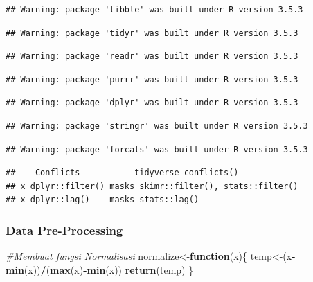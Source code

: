 \documentclass[]{article}
\newenvironment{Shaded}{\begin{snugshade}}{\end{snugshade}}
\newcommand{\CommentTok}[1]{\textcolor[rgb]{0.56,0.35,0.01}{\textit{#1}}}
\newcommand{\ControlFlowTok}[1]{\textcolor[rgb]{0.13,0.29,0.53}{\textbf{#1}}}
\newcommand{\KeywordTok}[1]{\textcolor[rgb]{0.13,0.29,0.53}{\textbf{#1}}}
\newcommand{\NormalTok}[1]{#1}
\newcommand{\OperatorTok}[1]{\textcolor[rgb]{0.81,0.36,0.00}{\textbf{#1}}}
\newcommand{\StringTok}[1]{\textcolor[rgb]{0.31,0.60,0.02}{#1}}
\begin{document}
\begin{verbatim}
## Warning: package 'tibble' was built under R version 3.5.3
\end{verbatim}

\begin{verbatim}
## Warning: package 'tidyr' was built under R version 3.5.3
\end{verbatim}

\begin{verbatim}
## Warning: package 'readr' was built under R version 3.5.3
\end{verbatim}

\begin{verbatim}
## Warning: package 'purrr' was built under R version 3.5.3
\end{verbatim}

\begin{verbatim}
## Warning: package 'dplyr' was built under R version 3.5.3
\end{verbatim}

\begin{verbatim}
## Warning: package 'stringr' was built under R version 3.5.3
\end{verbatim}

\begin{verbatim}
## Warning: package 'forcats' was built under R version 3.5.3
\end{verbatim}

\begin{verbatim}
## -- Conflicts --------- tidyverse_conflicts() --
## x dplyr::filter() masks skimr::filter(), stats::filter()
## x dplyr::lag()    masks stats::lag()
\end{verbatim}

\hypertarget{data-pre-processing}{%
\subsubsection{Data Pre-Processing}\label{data-pre-processing}}

\begin{Shaded}
\end{Shaded}

\begin{Shaded}
\begin{Highlighting}[]
\CommentTok{#Membuat fungsi Normalisasi}
\NormalTok{normalize<-}\ControlFlowTok{function}\NormalTok{(x)\{}
\NormalTok{  temp<-(x}\OperatorTok{-}\KeywordTok{min}\NormalTok{(x))}\OperatorTok{/}\NormalTok{(}\KeywordTok{max}\NormalTok{(x)}\OperatorTok{-}\KeywordTok{min}\NormalTok{(x))}
  \KeywordTok{return}\NormalTok{(temp)}
\NormalTok{\}}
\end{Highlighting}
\end{Shaded}
\end{document}
